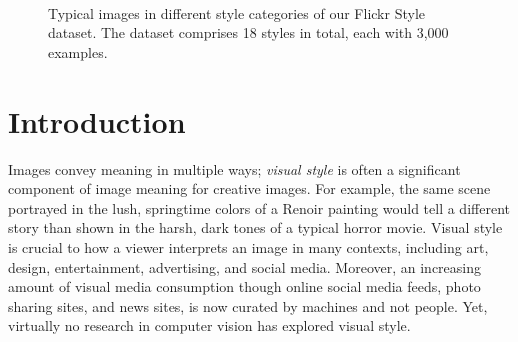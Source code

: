 

\begin{figure}[ht!]
\centering
{}~
~
\vspace{-2ex}

~
~
\vspace{-2ex}

~
~

\caption{
    Typical images in different style categories of our Flickr Style dataset.
    The dataset comprises 18 styles in total, each with 3,000 examples.
}
\label{fig:flickr_style_examples}
\end{figure}
\section{Introduction}

Images convey meaning in multiple ways; \textit{visual style} is often a significant component of image meaning for creative images.
For example, the same scene portrayed in
the lush, springtime colors of a Renoir painting would tell a different story than shown in the harsh, dark tones of a typical horror movie.
Visual style is crucial to how a viewer interprets an image in many contexts, including art, design, entertainment, advertising, and social media.
Moreover, an increasing amount of visual media consumption though online social media feeds, photo sharing sites, and news sites,
is now curated by machines and not people.
Yet, virtually no research in computer vision has explored visual style.

